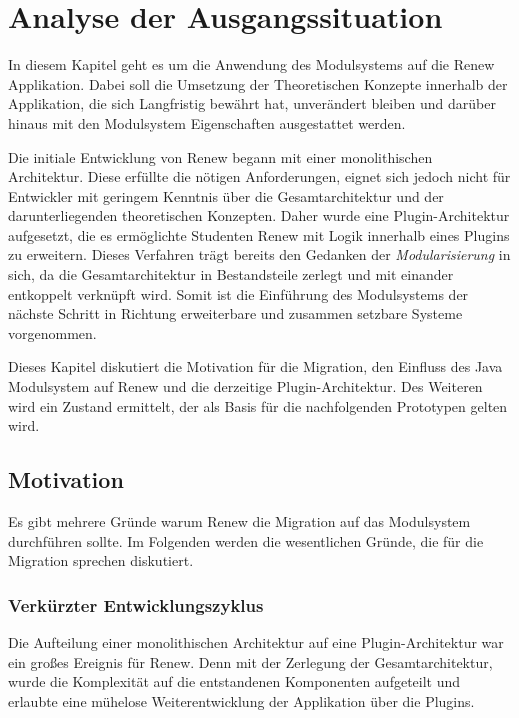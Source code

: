 \chapter{Analyse der Ausgangssituation}\label{cha:ausgangssituation}
In diesem Kapitel geht es um die Anwendung des Modulsystems auf die Renew Applikation. Dabei soll die Umsetzung der Theoretischen Konzepte innerhalb der Applikation, die sich Langfristig bewährt hat, unverändert bleiben und darüber hinaus mit den Modulsystem Eigenschaften ausgestattet werden. \bigbreak

Die initiale Entwicklung von Renew begann mit einer monolithischen Architektur. Diese erfüllte die nötigen Anforderungen, eignet sich jedoch nicht für Entwickler mit geringem Kenntnis über die Gesamtarchitektur und der darunterliegenden theoretischen Konzepten. Daher wurde eine Plugin-Architektur aufgesetzt, die es ermöglichte Studenten Renew mit Logik innerhalb eines Plugins zu erweitern. Dieses Verfahren trägt bereits den Gedanken der \textit{Modularisierung} in sich, da die Gesamtarchitektur in Bestandsteile zerlegt und mit einander entkoppelt verknüpft wird. Somit ist die Einführung des Modulsystems der nächste Schritt in Richtung erweiterbare und zusammen setzbare Systeme vorgenommen. \bigbreak

Dieses Kapitel diskutiert die Motivation für die Migration, den Einfluss des Java Modulsystem auf Renew und die derzeitige Plugin-Architektur. Des Weiteren wird ein Zustand ermittelt, der als Basis für die nachfolgenden Prototypen gelten wird.

\section{Motivation}\label{sec:motivation}
Es gibt mehrere Gründe warum Renew die Migration auf das Modulsystem durchführen sollte. Im Folgenden werden die wesentlichen Gründe, die für die Migration sprechen diskutiert.  

\subsection{Verkürzter Entwicklungszyklus}\label{sub:vez}
Die Aufteilung einer monolithischen Architektur auf eine Plugin-Architektur war ein großes Ereignis für Renew. Denn mit der Zerlegung der Gesamtarchitektur, wurde die Komplexität auf die entstandenen Komponenten aufgeteilt und erlaubte eine mühelose Weiterentwicklung der Applikation über die Plugins. \bigbreak

